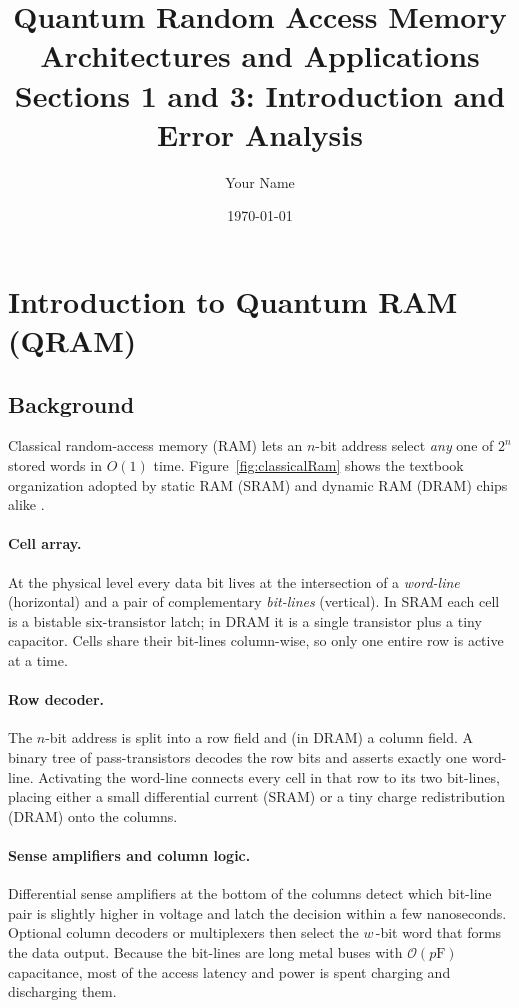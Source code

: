 \documentclass[11pt]{article}
\title{Quantum Random Access Memory Architectures and Applications\\
       \large Sections 1 and 3: Introduction and Error Analysis}
\author{Your Name}
\date{\today}
\begin{document}
\maketitle

\section{Introduction to Quantum RAM (QRAM)}
\subsection{Background}
Classical random-access memory (RAM) lets an $n$-bit address select
\emph{any} one of $2^{n}$ stored words in $O(1)$ time.  
Figure~\ref{fig:classicalRam} shows the textbook organization adopted by
static RAM (SRAM) and dynamic RAM (DRAM) chips alike
\cite{Hennessy2017,Jacob2007}.

\paragraph{Cell array.}
At the physical level every data bit lives at the intersection of a
\emph{word-line} (horizontal) and a pair of complementary
\emph{bit-lines} (vertical).
In SRAM each cell is a bistable six-transistor latch; in DRAM it is a
single transistor plus a tiny capacitor.
Cells share their bit-lines column-wise, so only one entire row is
active at a time.

\paragraph{Row decoder.}
The $n$-bit address is split into a
row field and (in DRAM) a column field.
A binary tree of pass-transistors decodes the row bits and asserts
exactly one word-line.
Activating the word-line connects every cell in that row to its two
bit-lines, placing either a small differential current (SRAM) or a tiny
charge redistribution (DRAM) onto the columns.

\paragraph{Sense amplifiers and column logic.}
Differential sense amplifiers at the bottom of the columns detect
which bit-line pair is slightly higher in voltage and latch the decision
within a few nanoseconds.
Optional column decoders or multiplexers then select the
$w$\,-bit word that forms the data output.
Because the bit-lines are long metal buses with $\mathcal{O}(p\mathrm{F})$
capacitance, most of the access latency and power is spent charging
and discharging them.
\end{document}
